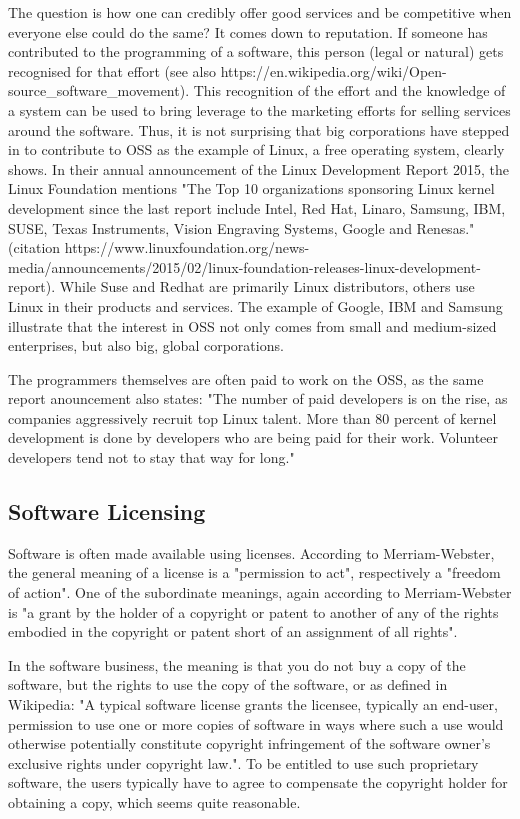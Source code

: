 \documentclass[a4paper]{report}
\begin{document}
The question is how one can credibly offer good services and be competitive when everyone else could do the same? It comes down to reputation. If someone has contributed to the programming of a software, this person (legal or natural) gets recognised for that effort (see also https://en.wikipedia.org/wiki/Open-source\_software\_movement). This recognition of the effort and the knowledge of a system can be used to bring leverage to the marketing efforts for selling services around the software. Thus, it is not surprising that big corporations have stepped in to contribute to OSS as the example of Linux, a free operating system, clearly shows. In their annual announcement of the Linux Development Report 2015, the Linux Foundation mentions "The Top 10 organizations sponsoring Linux kernel development since the last report include Intel, Red Hat, Linaro, Samsung, IBM, SUSE, Texas Instruments, Vision Engraving Systems, Google and Renesas." (citation https://www.linuxfoundation.org/news-media/announcements/2015/02/linux-foundation-releases-linux-development-report). While Suse and Redhat are primarily Linux distributors, others use Linux in their products and services. The example of Google, IBM and Samsung illustrate that the interest in OSS not only comes from small and medium-sized enterprises, but also big, global corporations.

The programmers themselves are often paid to work on the OSS, as the same report anouncement also states: "The number of paid developers is on the rise, as companies aggressively recruit top Linux talent. More than 80 percent of kernel development is done by developers who are being paid for their work. Volunteer developers tend not to stay that way for long."

\subsection{Software Licensing}
\label{ssec:SLic}
Software is often made available using licenses. According to Merriam-Webster, the general meaning of a license is a "permission to act", respectively a "freedom of action"\parencite{WebstLic}. One of the subordinate meanings, again according to Merriam-Webster is "a grant by the holder of a copyright or patent to another of any of the rights embodied in the copyright or patent short of an assignment of all rights". 

In the software business, the meaning is that you do not buy a copy of the software, but the rights to use the copy of the software, or as defined in Wikipedia: "A typical software license grants the licensee, typically an end-user, permission to use one or more copies of software in ways where such a use would otherwise potentially constitute copyright infringement of the software owner's exclusive rights under copyright law."\parencite{WikiSoftLic}. To be entitled to use such proprietary software, the users typically have to agree to compensate the copyright holder for obtaining a copy, which seems quite reasonable. 
\end{document}
